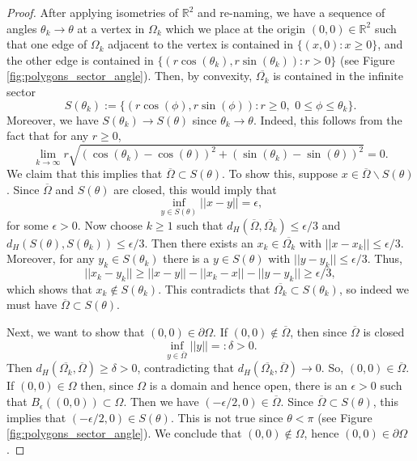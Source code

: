 \documentclass{amsart}
\theoremstyle{definition}
\newcommand*{\R}{\mathbb{R}}
\begin{document}
\begin{proof}
After applying isometries of $\R^2$ and re-naming, we have a sequence of angles $\theta_k \to \theta$ at a vertex in $\Omega_k$ which we place at the origin $(0,0) \in \R^2$ such that one edge of $\Omega_k$ adjacent to the vertex is contained in $\{(x,0) : x \geq 0\}$, and the other edge is contained in $\{(r\cos(\theta_k), r\sin(\theta_k)) : r > 0\}$ (see Figure \ref{fig:polygons_sector_angle}). Then, by convexity, $\overline{\Omega_k}$ is contained in the infinite sector
\begin{equation*}
    S(\theta_k) := \{(r\cos(\phi), r\sin(\phi)) : r \geq 0, \,\,0 \leq \phi \leq \theta_k\}.
\end{equation*}
Moreover, we have $S(\theta_k) \to S(\theta)$ since $\theta_k \to \theta$. Indeed, this follows from the fact that for any $r \geq 0$,
\begin{equation*}
    \lim_{k \to \infty} r\sqrt{(\cos(\theta_k) - \cos(\theta))^2 + (\sin(\theta_k) - \sin(\theta))^2} = 0.
\end{equation*}
We claim that this implies that $\overline{\Omega} \subset S(\theta)$. To show this, suppose $x \in \overline{\Omega} \backslash S(\theta)$. Since $\overline{\Omega}$ and $S(\theta)$ are closed, this would imply that 
\begin{equation*}
    \inf_{y \in S(\theta)} ||x-y|| = \epsilon,
\end{equation*}
for some $\epsilon > 0$. Now choose $k \geq 1$ such that $d_H(\overline{\Omega}, \overline{\Omega_k}) \leq \epsilon/3$ and $d_H(S(\theta), S(\theta_k)) \leq \epsilon/3$. Then there exists an $x_k \in \overline{\Omega_k}$ with $||x-x_k|| \leq \epsilon/3$. Moreover, for any $y_k \in S(\theta_k)$ there is a $y \in S(\theta)$ with $||y-y_k|| \leq \epsilon/3$. Thus,
\begin{equation*}
    ||x_k-y_k|| \geq ||x-y|| - ||x_k - x|| - ||y-y_k|| \geq \epsilon/3,
\end{equation*}
which shows that $x_k \notin S(\theta_k)$. This contradicts that $\overline{\Omega_k} \subset S(\theta_k)$, so indeed we must have $\overline{\Omega} \subset S(\theta)$. 

Next, we want to show that $(0,0) \in \partial\Omega$. If $(0,0) \notin \overline{\Omega}$, then since $\overline{\Omega}$ is closed
\begin{equation*}
    \inf_{y \in \overline{\Omega}} ||y|| =: \delta > 0.
\end{equation*}
Then $d_H(\overline{\Omega_k}, \overline{\Omega}) \geq \delta > 0$, contradicting that $d_H(\overline{\Omega_k}, \overline{\Omega}) \to 0$. So, $(0,0) \in \overline{\Omega}$. If $(0,0) \in \Omega$ then, since $\Omega$ is a domain and hence open, there is an $\epsilon > 0$ such that $B_\epsilon((0,0)) \subset \Omega$. Then we have $(-\epsilon/2,0) \in \overline{\Omega}$. Since $\overline{\Omega} \subset S(\theta)$, this implies that $(-\epsilon/2,0) \in S(\theta)$. This is not true since $\theta < \pi$ (see Figure \ref{fig:polygons_sector_angle}). We conclude that $(0,0) \notin \Omega$, hence $(0,0) \in \partial\Omega$. 



\end{proof}
\end{document}
